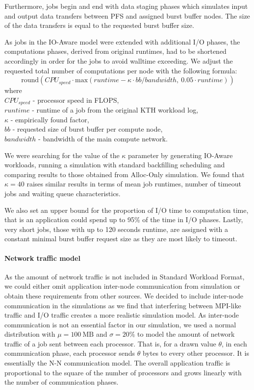 \documentclass[thesis-en.tex]{subfiles}
\begin{document}
Furthermore, jobs begin and end with data staging phases which simulates input and output data transfers between PFS and assigned burst buffer nodes. The size of the data transfers is equal to the requested burst buffer size.

As jobs in the IO-Aware model were extended with additional I/O phases, the computations phases, derived from original runtimes, had to be shortened accordingly in order for the jobs to avoid walltime exceeding. We adjust the requested total number of computations per node with the following formula:
\[ \text{round}(CPU_{speed} \cdot \text{max}(runtime - \kappa \cdot bb / bandwidth,\ 0.05 \cdot runtime)) \]
where\\ 
$CPU_{speed}$ - processor speed in FLOPS,\\ 
$runtime$ - runtime of a job from the original KTH workload log,\\
$\kappa$ - empirically found factor,\\
$bb$ - requested size of burst buffer per compute node,\\
$bandwidth$ - bandwidth of the main compute network.

We were searching for the value of the $\kappa$ parameter by generating IO-Aware workloads, running a simulation with standard backfilling scheduling and comparing results to those obtained from Alloc-Only simulation. We found that $\kappa=40$ raises similar results in terms of mean job runtimes, number of timeout jobs and waiting queue characteristics. 

We also set an upper bound for the proportion of I/O time to computation time, that is an application could spend up to 95\% of the time in I/O phases. Lastly, very short jobs, those with up to 120 seconds runtime, are assigned with a constant minimal burst buffer request size as they are most likely to timeout.

\paragraph{Network traffic model}
As the amount of network traffic is not included in Standard Workload Format, we could either omit application inter-node communication from simulation or obtain these requirements from other sources. We decided to include inter-node communication in the simulations as we find that interfering between MPI-like traffic and I/O traffic creates a more realistic simulation model. As inter-node communication is not an essential factor in our simulation, we used a normal distribution with $\mu=100\ \text{MB}$ and $\sigma=20\%$ to model the amount of network traffic of a job sent between each processor. That is, for a drawn value $\theta$, in each communication phase, each processor sends $\theta$ bytes to every other processor. It is essentially the N-N communication model. The overall application traffic is proportional to the square of the number of processors and grows linearly with the number of communication phases.
\end{document}
